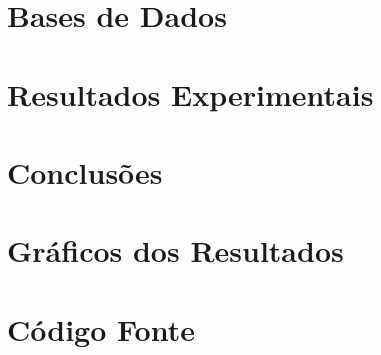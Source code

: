 \documentclass[a4paper,12pt,oneside,openany]{book}
\begin{document}
\chapter{Bases de Dados}
\label{cap5}


\chapter{Resultados Experimentais}
\label{cap6}


\chapter{Conclusões}
\label{cap7}


\normalsize
\cleardoublepage
{}
 


   \appendix
   \chapter{Gráficos dos Resultados}
   \label{ApendiceA}
   
   \chapter{Código Fonte}
   \label{ApendiceB}
   

\backmatter
\end{document}
